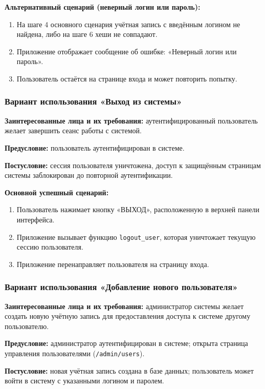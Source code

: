 \textbf{Альтернативный сценарий (неверный логин или пароль):}
\begin{enumerate}
	\item На шаге 4 основного сценария учётная запись с введённым логином не найдена, либо на шаге 6 хеши не совпадают.
	\item Приложение отображает сообщение об ошибке: «Неверный логин или пароль».
	\item Пользователь остаётся на странице входа и может повторить попытку.
\end{enumerate}

\subsubsection{Вариант использования «Выход из системы»}

\textbf{Заинтересованные лица и их требования:} аутентифицированный пользователь желает завершить сеанс работы с системой.

\textbf{Предусловие:} пользователь аутентифицирован в системе.

\textbf{Постусловие:} сессия пользователя уничтожена, доступ к защищённым страницам системы заблокирован до повторной аутентификации.

\textbf{Основной успешный сценарий:}
\begin{enumerate}
	\item Пользователь нажимает кнопку «ВЫХОД», расположенную в верхней панели интерфейса.
	\item Приложение вызывает функцию \texttt{logout\_user}, которая уничтожает текущую сессию пользователя.
	\item Приложение перенаправляет пользователя на страницу входа.
\end{enumerate}

\subsubsection{Вариант использования «Добавление нового пользователя»}

\textbf{Заинтересованные лица и их требования:} администратор системы желает создать новую учётную запись для предоставления доступа к системе другому пользователю.

\textbf{Предусловие:} администратор аутентифицирован в системе; открыта страница управления пользователями (\texttt{/admin/users}).

\textbf{Постусловие:} новая учётная запись создана в базе данных; пользователь может войти в систему с указанными логином и паролем.

